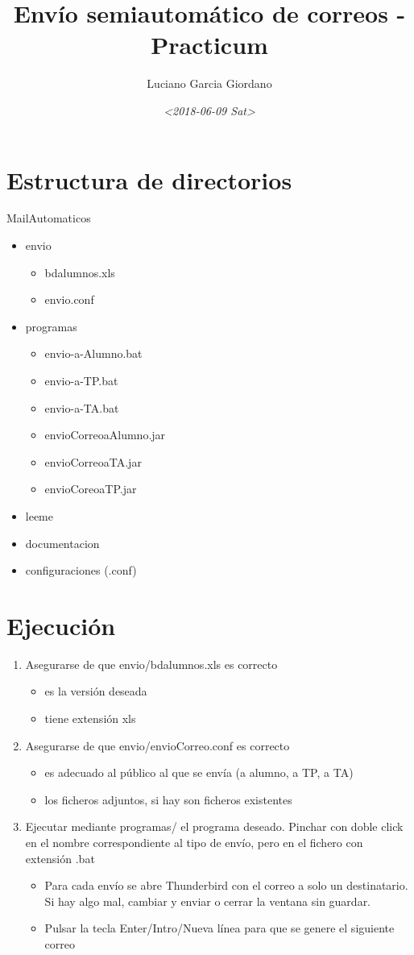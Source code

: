 \documentclass[11pt]{article}
\author{Luciano Garcia Giordano}
\date{\textit{<2018-06-09 Sat>}}
\title{Envío semiautomático de correos - Practicum}
\begin{document}
\maketitle
\tableofcontents


\section{Estructura de directorios}
\label{sec-1}
MailAutomaticos
\begin{itemize}
\item envio
\begin{itemize}
\item bdalumnos.xls
\item envio.conf
\end{itemize}
\item programas
\begin{itemize}
\item envio-a-Alumno.bat
\item envio-a-TP.bat
\item envio-a-TA.bat
\item envioCorreoaAlumno.jar
\item envioCorreoaTA.jar
\item envioCoreoaTP.jar
\end{itemize}
\item leeme
\item documentacion
\item configuraciones (.conf)
\end{itemize}

\section{Ejecución}
\label{sec-2}
\begin{enumerate}
\item Asegurarse de que envio/bdalumnos.xls es correcto
\begin{itemize}
\item es la versión deseada
\item tiene extensión xls
\end{itemize}
\item Asegurarse de que envio/envioCorreo.conf es correcto
\begin{itemize}
\item es adecuado al público al que se envía (a alumno, a TP, a TA)
\item los ficheros adjuntos, si hay son ficheros existentes
\end{itemize}
\item Ejecutar mediante programas/ el programa deseado. Pinchar con doble click en el nombre correspondiente al tipo de envío, pero en el fichero con extensión .bat
\begin{itemize}
\item Para cada envío se abre Thunderbird con el correo a solo un destinatario. Si hay algo mal, cambiar y enviar o cerrar la ventana sin guardar.
\item Pulsar la tecla Enter/Intro/Nueva línea para que se genere el siguiente correo
\end{itemize}
\end{enumerate}
\end{document}
